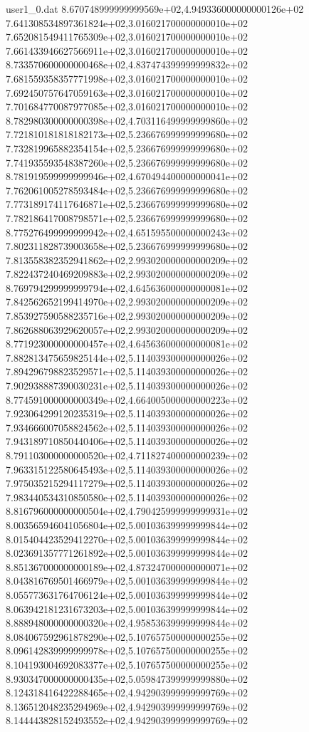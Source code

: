 \begin{filecontents}{user1_0.dat}
8.670748999999999569e+02,4.949336000000000126e+02
7.641308534897361824e+02,3.016021700000000010e+02
7.652081549411765309e+02,3.016021700000000010e+02
7.661433946627566911e+02,3.016021700000000010e+02
8.733570600000000468e+02,4.837474399999999832e+02
7.681559358357771998e+02,3.016021700000000010e+02
7.692450757647059163e+02,3.016021700000000010e+02
7.701684770087977085e+02,3.016021700000000010e+02
8.782980300000000398e+02,4.703116499999999860e+02
7.721810181818182173e+02,5.236676999999999680e+02
7.732819965882354154e+02,5.236676999999999680e+02
7.741935593548387260e+02,5.236676999999999680e+02
8.781919599999999946e+02,4.670494400000000041e+02
7.762061005278593484e+02,5.236676999999999680e+02
7.773189174117646871e+02,5.236676999999999680e+02
7.782186417008798571e+02,5.236676999999999680e+02
8.775276499999999942e+02,4.651595500000000243e+02
7.802311828739003658e+02,5.236676999999999680e+02
7.813558382352941862e+02,2.993020000000000209e+02
7.822437240469209883e+02,2.993020000000000209e+02
8.769794299999999794e+02,4.645636000000000081e+02
7.842562652199414970e+02,2.993020000000000209e+02
7.853927590588235716e+02,2.993020000000000209e+02
7.862688063929620057e+02,2.993020000000000209e+02
8.771923000000000457e+02,4.645636000000000081e+02
7.882813475659825144e+02,5.114039300000000026e+02
7.894296798823529571e+02,5.114039300000000026e+02
7.902938887390030231e+02,5.114039300000000026e+02
8.774591000000000349e+02,4.664005000000000223e+02
7.923064299120235319e+02,5.114039300000000026e+02
7.934666007058824562e+02,5.114039300000000026e+02
7.943189710850440406e+02,5.114039300000000026e+02
8.791103000000000520e+02,4.711827400000000239e+02
7.963315122580645493e+02,5.114039300000000026e+02
7.975035215294117279e+02,5.114039300000000026e+02
7.983440534310850580e+02,5.114039300000000026e+02
8.816796000000000504e+02,4.790425999999999931e+02
8.003565946041056804e+02,5.001036399999999844e+02
8.015404423529412270e+02,5.001036399999999844e+02
8.023691357771261892e+02,5.001036399999999844e+02
8.851367000000000189e+02,4.873247000000000071e+02
8.043816769501466979e+02,5.001036399999999844e+02
8.055773631764706124e+02,5.001036399999999844e+02
8.063942181231673203e+02,5.001036399999999844e+02
8.888948000000000320e+02,4.958536399999999844e+02
8.084067592961878290e+02,5.107657500000000255e+02
8.096142839999999978e+02,5.107657500000000255e+02
8.104193004692083377e+02,5.107657500000000255e+02
8.930347000000000435e+02,5.059847399999999880e+02
8.124318416422288465e+02,4.942903999999999769e+02
8.136512048235294969e+02,4.942903999999999769e+02
8.144443828152493552e+02,4.942903999999999769e+02

\end{filecontents}
